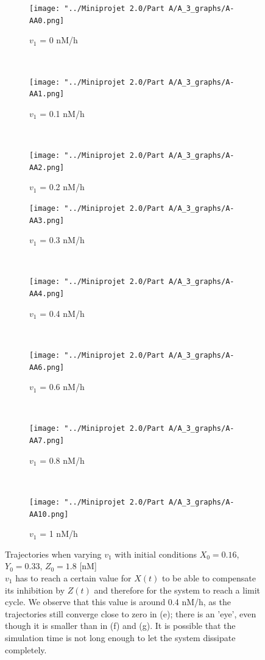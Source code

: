 \documentclass[10pt,a4paper,oneside,twocolumn]{article}
\numberwithin{equation}{section} %
\begin{document}
    \begin{figure}
    \centering
	\begin{subfigure}[b]{0.32\textwidth}
	    \texttt{[image: "../Miniprojet 2.0/Part A/A\_3\_graphs/A-AA0.png]}
	    \caption{$v_1$ = 0 nM/h}
	\end{subfigure}
	~ 
	\begin{subfigure}[b]{0.32\textwidth}
	    \texttt{[image: "../Miniprojet 2.0/Part A/A\_3\_graphs/A-AA1.png]}
	    \caption{$v_1$ = 0.1 nM/h}
	\end{subfigure}
	~ 
	\begin{subfigure}[b]{0.32\textwidth}
	    \texttt{[image: "../Miniprojet 2.0/Part A/A\_3\_graphs/A-AA2.png]}
	    \caption{$v_1$ = 0.2 nM/h}
	\end{subfigure}
	 
	\begin{subfigure}[b]{0.32\textwidth}
	    \texttt{[image: "../Miniprojet 2.0/Part A/A\_3\_graphs/A-AA3.png]}
	    \caption{$v_1$ = 0.3 nM/h}
	\end{subfigure}
	~ 
	\begin{subfigure}[b]{0.32\textwidth}
	    \texttt{[image: "../Miniprojet 2.0/Part A/A\_3\_graphs/A-AA4.png]}
	    \caption{$v_1$ = 0.4 nM/h}
	\end{subfigure}
	~
	\begin{subfigure}[b]{0.32\textwidth}
	    \texttt{[image: "../Miniprojet 2.0/Part A/A\_3\_graphs/A-AA6.png]}
	    \caption{$v_1$ = 0.6 nM/h}
	\end{subfigure}
	~ 
	\begin{subfigure}[b]{0.32\textwidth}
	    \texttt{[image: "../Miniprojet 2.0/Part A/A\_3\_graphs/A-AA7.png]}
	    \caption{$v_1$ = 0.8 nM/h}
	\end{subfigure}
	~
	\begin{subfigure}[b]{0.32\textwidth}
	    \texttt{[image: "../Miniprojet 2.0/Part A/A\_3\_graphs/A-AA10.png]}
	    \caption{$v_1$ = 1 nM/h}
	\end{subfigure}
	
	\caption{Trajectories when varying $v_1$ with initial conditions $X_0 = 0.16$, $Y_0 = 0.33 $, $Z_0 = 1.8$ [nM]\\
	$v_1$ has to reach a certain value for $X(t)$ to be able to compensate its inhibition by $Z(t)$ and therefore for the system to reach a limit cycle. We observe that this value is around 0.4 nM/h, as the trajectories still converge close to zero in (e); there is an 'eye', even though it is smaller than in (f) and (g). It is possible that the simulation time is not long enough to let the system dissipate completely.
	}
	\label{fig:6}
    \end{figure}
\end{document}
